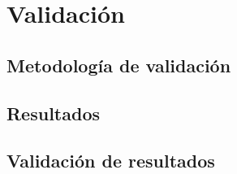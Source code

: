 \chapter{Validación}

\section{Metodología de validación}

\medskip

\section{Resultados}

\medskip

\section{Validación de resultados}